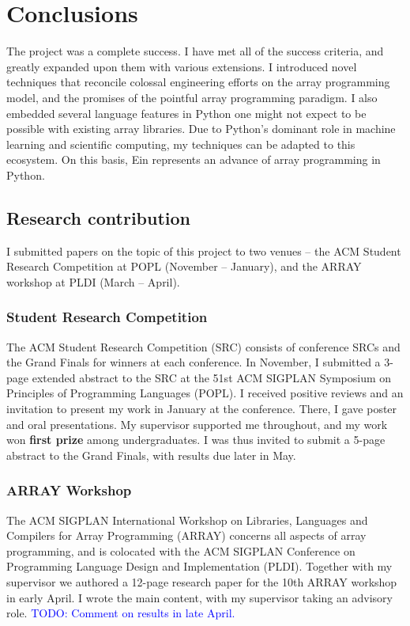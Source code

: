 \chapter{Conclusions}

The project was a complete success. 
I have met all of the success criteria, and greatly expanded upon them with various extensions. 
I introduced novel techniques that reconcile colossal engineering efforts on the array programming model, and the promises of the pointful array programming paradigm. 
I also embedded several language features in Python one might not expect to be possible with existing array libraries. 
Due to Python's dominant role in machine learning and scientific computing, my techniques can be adapted to this ecosystem. 
On this basis, Ein represents an advance of array programming in Python.


\section{Research contribution}
\label{research-contribution}

I submitted papers on the topic of this project to two venues -- the ACM Student Research Competition at POPL (November -- January), and the ARRAY workshop at PLDI (March -- April).

\subsection{Student Research Competition}

The ACM Student Research Competition (SRC) consists of conference SRCs and the Grand Finals for winners at each conference. In November, I submitted a 3-page extended abstract to the SRC at the 51st ACM SIGPLAN Symposium on Principles of Programming Languages (POPL).
I received positive reviews and an invitation to present my work in January at the conference. 
There, I gave poster and oral presentations.
My supervisor supported me throughout, and
my work won \textbf{first prize} among undergraduates. 
I was thus invited to submit a 5-page abstract to the Grand Finals, with results due later in May.

\subsection{ARRAY Workshop}

The ACM SIGPLAN International Workshop on Libraries, Languages and Compilers for Array Programming (ARRAY) concerns all aspects of array programming, and is colocated with the ACM SIGPLAN Conference on Programming Language Design and Implementation (PLDI). Together with my supervisor we authored a 12-page research paper for the 10th ARRAY workshop in early April. I wrote the main content, with my supervisor taking an advisory role. \textcolor{blue}{TODO: Comment on results in late April.}

